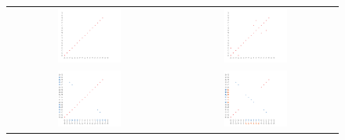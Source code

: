 \begin{figure}[p]
\mySfFamily
\centering
\begin{tabular}{c @{\hskip 2em} c}
\includegraphics[width = 0.4\textwidth]{images/rearrangements/genomic_dot_plots-1} & \includegraphics[width = 0.4\textwidth]{images/rearrangements/genomic_dot_plots-2}\\[3ex]
\includegraphics[width = 0.4\textwidth]{images/rearrangements/genomic_dot_plots-3} & \includegraphics[width = 0.4\textwidth]{images/rearrangements/genomic_dot_plots-4}
\end{tabular}

\end{figure}
